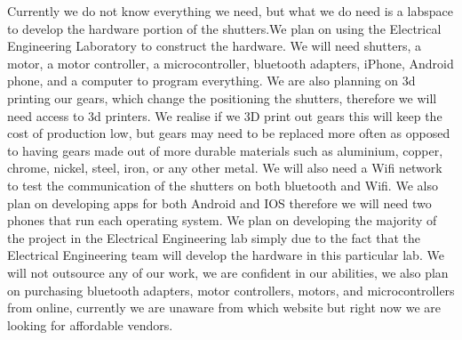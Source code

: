 Currently we do not know everything we need, but what we do need is a labspace to develop the hardware portion of the shutters.We plan on using the Electrical Engineering Laboratory to construct the hardware. We will need shutters, a motor, a motor controller, a microcontroller, bluetooth adapters, iPhone, Android phone, and a computer to program everything. We are also planning on 3d printing our gears, which change the positioning the shutters, therefore we will need access to 3d printers. We realise if we 3D print out gears this will keep the cost of production low, but gears may need to be replaced more often as opposed to having gears made out of more durable materials such as aluminium, copper, chrome, nickel, steel, iron, or any other metal. We will also need a Wifi network to test the communication of the shutters on both bluetooth and Wifi. We also plan on developing apps for both Android and IOS therefore we will need two phones that run each operating system. We plan on developing the majority of the project in the Electrical Engineering lab simply due to the fact that the Electrical Engineering team will develop the hardware in this particular lab. We will not outsource any of our work, we are confident in our abilities, we also plan on purchasing bluetooth adapters, motor controllers, motors, and microcontrollers from online, currently we are unaware from which website but right now we are looking for affordable vendors. 

